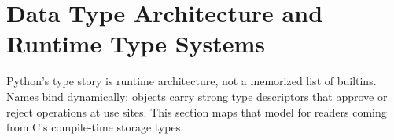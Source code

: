 \section{Data Type Architecture and Runtime Type Systems}

Python's type story is runtime architecture, not a memorized list of builtins. Names bind dynamically; objects carry strong type descriptors that approve or reject operations at use sites. This section maps that model for readers coming from C's compile-time storage types.

